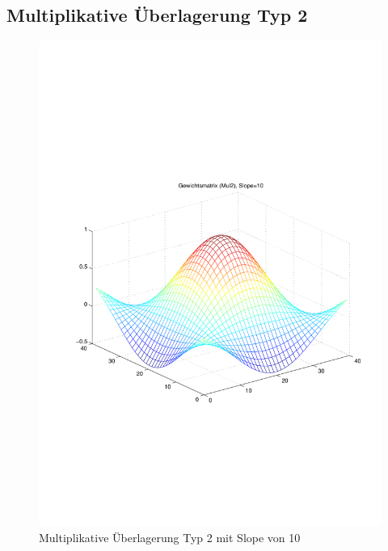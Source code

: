 \subsection{Multiplikative Überlagerung Typ 2}
\begin{figure}[hbt]
	\begin{minipage}{0.5 \textwidth}
		\includegraphics[width=\textwidth]{./Bilder/Auswertung/Gewichtsmatrix/Gewichtsmatrix_Mul2_Slope_10}
		\caption{Multiplikative Überlagerung Typ 2 mit Slope von 10}
		\label{Mul210}
	\end{minipage}
	\hfill
	\begin{minipage}{0.5 \textwidth}

\end{minipage}
\end{figure}
